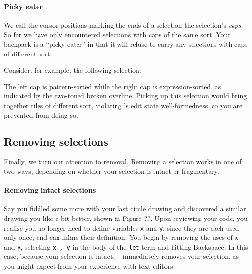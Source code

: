 


\paragraph{Picky eater}
We call the cursor positions marking the ends of a selection
the selection's \emph{caps}.
So far we have only encountered selections with caps
of the same sort.
Your backpack is a ``picky eater'' in that
it will refuse to carry any selections with caps of
different sort.

Consider, for example, the following selection:


\noindent
The left cap is pattern-sorted while the right cap
is expression-sorted, as indicated by the two-toned
broken overline.
Picking up this selection would bring together
tiles of different sort, violating \tylr's edit
state well-formedness, so you are prevented from doing so.



\subsection{Removing selections}
Finally, we turn our attention to removal.
Removing a selection works in one of two ways,
depending on whether your selection is intact or fragmentary.

\paragraph{Removing intact selections}
Say you fiddled some more with your last circle drawing
and discovered a similar drawing you like a bit better,
shown in Figure ??.
Upon reviewing your code, you realize you no longer
need to define variables \texttt{x} and \texttt{y},
since they are each used only once, and can inline
their definition.
You begin by removing the uses of \texttt{x} and \texttt{y},
selecting \texttt{x , y} in the body of the \texttt{let}
term and hitting Backspace.
In this case, because your selection is intact, \tylr~
immediately removes your selection, as you might
expect from your experience with text editors.

